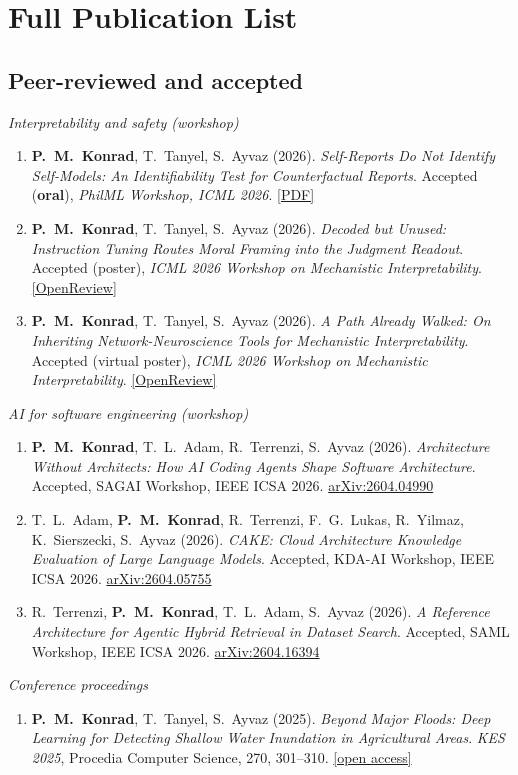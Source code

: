 \documentclass[11pt,a4paper,sans]{moderncv}
\begin{document}
\section{Full Publication List}

\subsection{Peer-reviewed and accepted}
\nopagebreak
{\itshape Interpretability and safety (workshop)}
\begin{enumerate}
\item \textbf{P.~M.~Konrad}, T.~Tanyel, S.~Ayvaz (2026). \emph{Self-Reports Do Not Identify Self-Models: An Identifiability Test for Counterfactual Reports}. Accepted (\textbf{oral}), \textit{PhilML Workshop, ICML 2026}. \href{https://phomarkon.github.io/papers/ICML_2026_Workshop_Counterfactual_Self_Reports_Not_Well_Posed.pdf}{[PDF]}
\item \textbf{P.~M.~Konrad}, T.~Tanyel, S.~Ayvaz (2026). \emph{Decoded but Unused: Instruction Tuning Routes Moral Framing into the Judgment Readout}. Accepted (poster), \textit{ICML 2026 Workshop on Mechanistic Interpretability}. \href{https://openreview.net/forum?id=da9ylT2doy}{[OpenReview]}
\item \textbf{P.~M.~Konrad}, T.~Tanyel, S.~Ayvaz (2026). \emph{A Path Already Walked: On Inheriting Network-Neuroscience Tools for Mechanistic Interpretability}. Accepted (virtual poster), \textit{ICML 2026 Workshop on Mechanistic Interpretability}. \href{https://openreview.net/forum?id=dSfjkJB3bQ}{[OpenReview]}
\end{enumerate}
{\itshape AI for software engineering (workshop)}
\begin{enumerate}[start=4]
\item \textbf{P.~M.~Konrad}, T.~L.~Adam, R.~Terrenzi, S.~Ayvaz (2026). \emph{Architecture Without Architects: How AI Coding Agents Shape Software Architecture}. Accepted, SAGAI Workshop, IEEE ICSA 2026. \href{https://arxiv.org/abs/2604.04990}{arXiv:2604.04990}
\item T.~L.~Adam, \textbf{P.~M.~Konrad}, R.~Terrenzi, F.~G.~Lukas, R.~Yilmaz, K.~Sierszecki, S.~Ayvaz (2026). \emph{CAKE: Cloud Architecture Knowledge Evaluation of Large Language Models}. Accepted, KDA-AI Workshop, IEEE ICSA 2026. \href{https://arxiv.org/abs/2604.05755}{arXiv:2604.05755}
\item R.~Terrenzi, \textbf{P.~M.~Konrad}, T.~L.~Adam, S.~Ayvaz (2026). \emph{A Reference Architecture for Agentic Hybrid Retrieval in Dataset Search}. Accepted, SAML Workshop, IEEE ICSA 2026. \href{https://arxiv.org/abs/2604.16394}{arXiv:2604.16394}
\end{enumerate}
{\itshape Conference proceedings}
\begin{enumerate}[start=7]
\item \textbf{P.~M.~Konrad}, T.~Tanyel, S.~Ayvaz (2025). \emph{Beyond Major Floods: Deep Learning for Detecting Shallow Water Inundation in Agricultural Areas}. \textit{KES 2025}, Procedia Computer Science, 270, 301--310. \href{https://www.sciencedirect.com/science/article/pii/S1877050925028194}{[open access]}
\end{enumerate}
\end{document}
